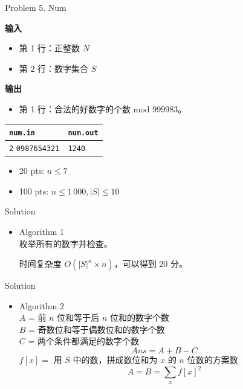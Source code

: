 \documentclass[UTF8]{beamer}
\begin{document}
\begin{frame}{Problem 5. Num}

\textbf{输入}
\begin{itemize}
    \item 第 1 行：正整数 $N$
    \item 第 2 行：数字集合 $S$
\end{itemize}
\textbf{输出}
\begin{itemize}
    \item 第 1 行：合法的好数字的个数 mod 999983。
\end{itemize}

\begin{tabularx}{\textwidth}{|X|X|}
\hline
\texttt{\textbf{num.in}} & \texttt{\textbf{num.out}} \\ \hline
\texttt{2}\newline
\texttt{0987654321}
&
\texttt{1240}
\\ \hline
\end{tabularx}
\newline
\begin{itemize}
    \item 20 pts: $n \leq 7$
    \item 100 pts: $n \leq 1\,000, |S| \leq 10$
\end{itemize}

\end{frame}

\begin{frame}{Solution}

\begin{itemize}
    \item Algorithm 1 \\
        枚举所有的数字并检查。

        时间复杂度 $O(|S|^n \times n)$，可以得到 20 分。
\end{itemize}

\end{frame}

\begin{frame}{Solution}

\begin{itemize}
    \item Algorithm 2 \\
        $A$ = 前 $n$ 位和等于后 $n$ 位和的数字个数 \\
        $B$ = 奇数位和等于偶数位和的数字个数 \\
        $C$ = 两个条件都满足的数字个数
        $$
            Ans = A + B - C
        $$
        \pause
        $f[x] =$ 用 $S$ 中的数，拼成数位和为 $x$ 的 $n$ 位数的方案数
        $$
            A = B = \sum_{x} f[x]^2
        $$
\end{itemize}

\end{frame}
\end{document}
